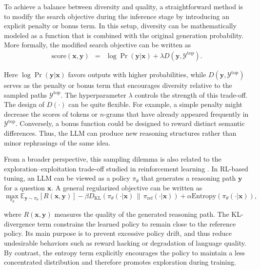 To achieve a balance between diversity and quality, a straightforward method is to modify the search objective during the inference stage by introducing an explicit penalty or bonus term. In this setup, diversity can be mathematically modeled as a function that is combined with the original generation probability. More formally, the modified search objective can be written as
\begin{eqnarray}
\mathrm{score}(\mathbf{x},\mathbf{y}) & = & \log \Pr(\mathbf{y}|\mathbf{x}) + \lambda D(\mathbf{y},\mathcal{Y}^{\mathrm{top}}). \label{diversity-quality-inference}
\end{eqnarray}

\noindent Here $\log \Pr(\mathbf{y} | \mathbf{x})$ favors outputs with higher probabilities, while $D(\mathbf{y},\mathcal{Y}^{\mathrm{top}})$ serves as the penalty or bonus term that encourages diversity relative to the sampled paths $\mathcal{Y}^{\mathrm{top}}$. The hyperparameter $\lambda$ controls the strength of this trade-off.
The design of $D(\cdot)$ can be quite flexible. For example, a simple penalty might decrease the scores of tokens or $n$-grams that have already appeared frequently in $\mathcal{Y}^{\mathrm{top}}$. Conversely, a bonus function could be designed to reward distinct semantic differences. Thus, the LLM can produce new reasoning structures rather than minor rephrasings of the same idea.

From a broader perspective, this sampling dilemma is also related to the exploration--exploitation trade-off studied in reinforcement learning \cite{Sutton-and-Barto:2018RL}. In RL-based tuning, an LLM can be viewed as a policy $\pi_\theta$ that generates a reasoning path $\mathbf{y}$ for a question $\mathbf{x}$. A general regularized objective can be written as
\begin{equation}
\max_{\pi_\theta} \mathbb{E}_{\mathbf{y}\sim\pi_\theta} \left[R(\mathbf{x},\mathbf{y})\right] - \beta D_{\mathrm{KL}} \left( \pi_\theta(\cdot|\mathbf{x}) \,\|\,  \pi_{\mathrm{ref}}(\cdot|\mathbf{x}) \right) + \alpha \mathrm{Entropy} \left( \pi_\theta(\cdot|\mathbf{x}) \right),
\label{diversity-quality-rl}
\end{equation}

\noindent where $R(\mathbf{x},\mathbf{y})$ measures the quality of the generated reasoning path. The KL-divergence term constrains the learned policy to remain close to the reference policy. Its main purpose is to prevent excessive policy drift, and thus reduce undesirable behaviors such as reward hacking or degradation of language quality. By contrast, the entropy term explicitly encourages the policy to maintain a less concentrated distribution and therefore promotes exploration during training.

